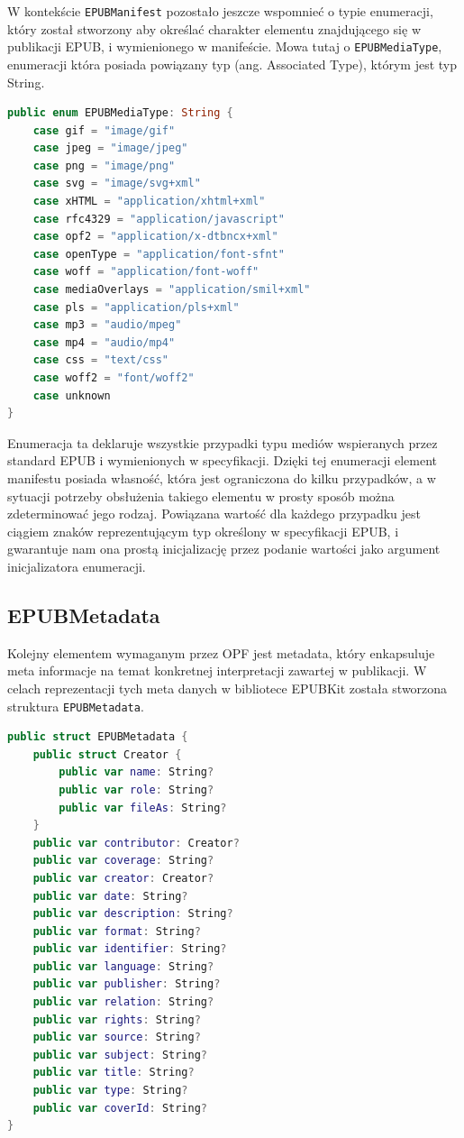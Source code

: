 W kontekście \texttt{EPUBManifest} pozostało jeszcze wspomnieć o typie enumeracji, który został stworzony aby określać charakter elementu znajdującego się w publikacji EPUB, i wymienionego w manifeście. Mowa tutaj o \texttt{EPUBMediaType}, enumeracji która posiada powiązany typ (ang. Associated Type), którym jest typ String.

\begin{lstlisting}[caption={Enumeracja EPUBMediaType.}, language=swift]
public enum EPUBMediaType: String {
    case gif = "image/gif"
    case jpeg = "image/jpeg"
    case png = "image/png"
    case svg = "image/svg+xml"
    case xHTML = "application/xhtml+xml"
    case rfc4329 = "application/javascript"
    case opf2 = "application/x-dtbncx+xml"
    case openType = "application/font-sfnt"
    case woff = "application/font-woff"
    case mediaOverlays = "application/smil+xml"
    case pls = "application/pls+xml"
    case mp3 = "audio/mpeg"
    case mp4 = "audio/mp4"
    case css = "text/css"
    case woff2 = "font/woff2"
    case unknown
}
\end{lstlisting}

Enumeracja ta deklaruje wszystkie przypadki typu mediów wspieranych przez standard EPUB i wymienionych w specyfikacji. Dzięki tej enumeracji element manifestu posiada własność, która jest ograniczona do kilku przypadków, a w sytuacji potrzeby obsłużenia takiego elementu w prosty sposób można zdeterminować jego rodzaj. Powiązana wartość dla każdego przypadku jest ciągiem znaków reprezentującym typ określony w specyfikacji EPUB, i gwarantuje nam ona prostą inicjalizację przez podanie wartości jako argument inicjalizatora enumeracji.

\subsection{EPUBMetadata}

Kolejny elementem wymaganym przez OPF jest metadata, który enkapsuluje meta informacje na temat konkretnej interpretacji zawartej w publikacji. W celach reprezentacji tych meta danych w bibliotece EPUBKit została stworzona struktura \texttt{EPUBMetadata}.

\begin{lstlisting}[caption={Struktura EPUBMetadata}, language=swift,label=EPUBMetadata-declaration]
public struct EPUBMetadata {
    public struct Creator {
        public var name: String?
        public var role: String?
        public var fileAs: String?
    }
    public var contributor: Creator?
    public var coverage: String?
    public var creator: Creator?
    public var date: String?
    public var description: String?
    public var format: String?
    public var identifier: String?
    public var language: String?
    public var publisher: String?
    public var relation: String?
    public var rights: String?
    public var source: String?
    public var subject: String?
    public var title: String?
    public var type: String?
    public var coverId: String?
}
\end{lstlisting}

